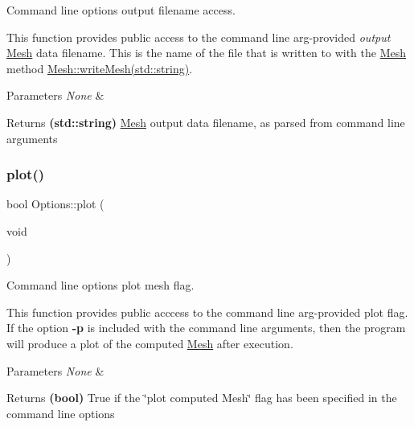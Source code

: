 Command line options output filename access. 

This function provides public access to the command line arg-\/provided {\itshape output} \mbox{\hyperlink{class_mesh}{Mesh}} data filename. This is the name of the file that is written to with the \mbox{\hyperlink{class_mesh}{Mesh}} method \mbox{\hyperlink{class_mesh_a4d194fe4ce2b4fa4c11274c893c6ae29}{Mesh\+::write\+Mesh(std\+::string)}}. 
\begin{DoxyParams}{Parameters}
{\em None} & \\
\hline
\end{DoxyParams}
\begin{DoxyReturn}{Returns}
{\bfseries (std\+::string)} \mbox{\hyperlink{class_mesh}{Mesh}} output data filename, as parsed from command line arguments 
\end{DoxyReturn}
\mbox{\label{class_options_a6d00df300abbec9c39990eb8858f1255}} 
\subsubsection{\texorpdfstring{plot()}{plot()}}
{\footnotesize\ttfamily bool Options\+::plot (\begin{DoxyParamCaption}\item[{void}]{ }\end{DoxyParamCaption})\hspace{0.3cm}{\ttfamily [inline]}}



Command line options plot mesh flag. 

This function provides public acccess to the command line arg-\/provided plot flag. If the option {\bfseries -\/p} is included with the command line arguments, then the program will produce a plot of the computed \mbox{\hyperlink{class_mesh}{Mesh}} after execution. 
\begin{DoxyParams}{Parameters}
{\em None} & \\
\hline
\end{DoxyParams}
\begin{DoxyReturn}{Returns}
{\bfseries (bool)} True if the \char`\"{}plot computed Mesh\char`\"{} flag has been specified in the command line options 
\end{DoxyReturn}
\mbox{\label{class_options_a896737c665d9c0ee7a17a0cdedf66bb7}} 
